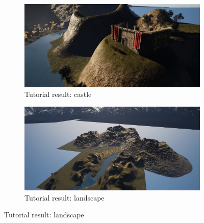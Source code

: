 \documentclass[
  a4paper,  %
  twoside,  %
  bibliography=totoc,
  headsepline,
  cleardoublepage=empty,
  parskip=half,
  draft=false
]{scrbook}
\begin{document}
\begin{figure}[h]
  \centering
  \begin{subfigure}{0.45\textwidth}
    \includegraphics[width=\linewidth]{graphics/unreal-engine/Basics/Landscape-Castle.png}
    \caption{Tutorial result: castle}
  \end{subfigure}
  \begin{subfigure}{0.45\textwidth}
    \includegraphics[width=\linewidth]{graphics/unreal-engine/Basics/Landscape-Overview.png}
    \caption{Tutorial result: landscape}
  \end{subfigure}


\end{figure}
\end{document}
